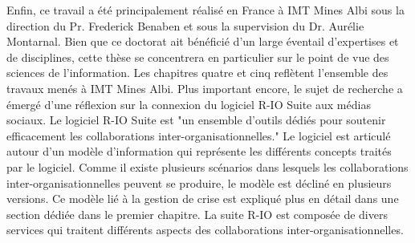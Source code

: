 Enfin, ce travail a été principalement réalisé en France à IMT Mines Albi sous la direction du Pr. Frederick Benaben et sous la supervision du Dr. Aurélie Montarnal.
Bien que ce doctorat ait bénéficié d'un large éventail d'expertises et de disciplines, cette thèse se concentrera en particulier sur le point de vue des sciences de l'information.
Les chapitres quatre et cinq reflètent l'ensemble des travaux menés à IMT Mines Albi.
Plus important encore, le sujet de recherche a émergé d'une réflexion sur la connexion du logiciel R-IO Suite aux médias sociaux.
Le logiciel R-IO Suite est "un ensemble d'outils dédiés pour soutenir efficacement les collaborations inter-organisationnelles."
Le logiciel est articulé autour d'un modèle d'information qui représente les différents concepts traités par le logiciel.
Comme il existe plusieurs scénarios dans lesquels les collaborations inter-organisationnelles peuvent se produire, le modèle est décliné en plusieurs versions.
Ce modèle lié à la gestion de crise est expliqué plus en détail dans une section dédiée dans le premier chapitre.
La suite R-IO est composée de divers services qui traitent différents aspects des collaborations inter-organisationnelles.